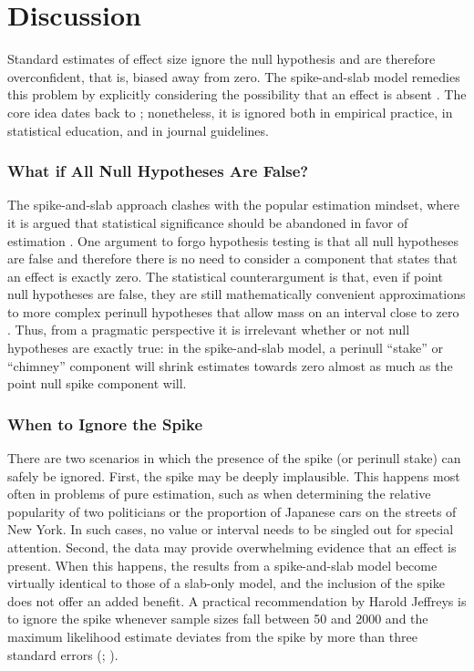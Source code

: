 \documentclass[a4paper]{article}
\begin{document}
\section*{Discussion}
Standard estimates of effect size ignore the null hypothesis and are therefore overconfident, that is, biased away from zero. The spike-and-slab model remedies this problem by explicitly considering the possibility that an effect is absent \cite{Robinson2019,RouderEtAl2018PBR}. The core idea dates back to ; nonetheless, it is ignored both in empirical practice, in statistical education, and in journal guidelines.

\subsubsection*{What if All Null Hypotheses Are False?}
The spike-and-slab approach clashes with the popular estimation mindset, where it is argued that statistical significance should be abandoned in favor of estimation \cite{McShane2019abandon, Cumming2016introduction, valentine2015life, Cumming2014}. One argument to forgo hypothesis testing is that all null hypotheses are false \cite{Cohen1990, Meehl1978} and therefore there is no need to consider a component that states that an effect is exactly zero. The statistical counterargument is that, even if point null hypotheses are false, they are still mathematically convenient approximations to more complex perinull hypotheses that allow mass on an interval close to zero \cite{BergerDelampady1987, KiersTendeiro2019}. Thus, from a pragmatic perspective it is irrelevant whether or not null hypotheses are exactly true: in the spike-and-slab model, a perinull ``stake'' or ``chimney'' \cite{KiersTendeiro2019} component will shrink estimates towards zero almost as much as the point null spike component will. 

\subsubsection*{When to Ignore the Spike}
There are two scenarios in which the presence of the spike (or perinull stake) can safely be ignored. First, the spike may be deeply implausible. This happens most often in problems of pure estimation, such as when determining the relative popularity of two politicians or the proportion of Japanese cars on the streets of New York. In such cases, no value or interval needs to be singled out for special attention. Second, the data may provide overwhelming evidence that an effect is present. When this happens, the results from a spike-and-slab model become virtually identical to those of a slab-only model, and the inclusion of the spike does not offer an added benefit. A practical recommendation by Harold Jeffreys is to ignore the spike whenever sample sizes fall between 50 and 2000 and the maximum likelihood estimate deviates from the spike by more than three standard errors (; ).
\end{document}
